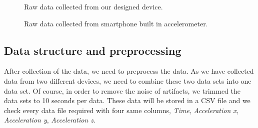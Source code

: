 \documentclass[10pt,twocolumn,letterpaper]{article}
\begin{document}
\begin{figure}[t]
    \centering
    \caption{Raw data collected from our designed device.}
    \label{fig:f7}
\end{figure}

\begin{figure}[t]
    \centering
    \caption{Raw data collected from smartphone built in accelerometer.}
    \label{fig:f8}
\end{figure}

\subsection{Data structure and preprocessing}
\label{sec:data_structure}

    After collection of the data, we need to preprocess the data. As we have collected data from two different devices, we need to combine these two data sets into one data set. Of course, in order to remove the noise of artifacts, we trimmed the data sets to 10 seconds per data. These data will be stored in a CSV file and we check every data file required with four same columns, \textit{Time}, \textit{Acceleration x}, \textit{Acceleration y}, \textit{Acceleration z}.
\end{document}
